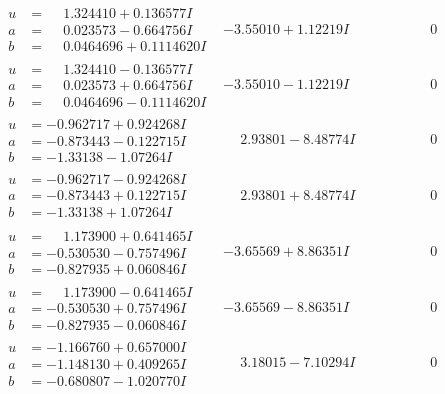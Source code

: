 \documentclass[1p]{elsarticle_modified}
\theoremstyle{definition}
\begin{document}
$$\begin{array}{c|c|c}
\begin{aligned}
u &= \phantom{-}1.324410 + 0.136577 I \\
a &= \phantom{-}0.023573 - 0.664756 I \\
b &= \phantom{-}0.0464696 + 0.1114620 I\end{aligned}
 & -3.55010 + 1.12219 I & \phantom{-0.000000 } 0 \\ \hline\begin{aligned}
u &= \phantom{-}1.324410 - 0.136577 I \\
a &= \phantom{-}0.023573 + 0.664756 I \\
b &= \phantom{-}0.0464696 - 0.1114620 I\end{aligned}
 & -3.55010 - 1.12219 I & \phantom{-0.000000 } 0 \\ \hline\begin{aligned}
u &= -0.962717 + 0.924268 I \\
a &= -0.873443 - 0.122715 I \\
b &= -1.33138 - 1.07264 I\end{aligned}
 & \phantom{-}2.93801 - 8.48774 I & \phantom{-0.000000 } 0 \\ \hline\begin{aligned}
u &= -0.962717 - 0.924268 I \\
a &= -0.873443 + 0.122715 I \\
b &= -1.33138 + 1.07264 I\end{aligned}
 & \phantom{-}2.93801 + 8.48774 I & \phantom{-0.000000 } 0 \\ \hline\begin{aligned}
u &= \phantom{-}1.173900 + 0.641465 I \\
a &= -0.530530 - 0.757496 I \\
b &= -0.827935 + 0.060846 I\end{aligned}
 & -3.65569 + 8.86351 I & \phantom{-0.000000 } 0 \\ \hline\begin{aligned}
u &= \phantom{-}1.173900 - 0.641465 I \\
a &= -0.530530 + 0.757496 I \\
b &= -0.827935 - 0.060846 I\end{aligned}
 & -3.65569 - 8.86351 I & \phantom{-0.000000 } 0 \\ \hline\begin{aligned}
u &= -1.166760 + 0.657000 I \\
a &= -1.148130 + 0.409265 I \\
b &= -0.680807 - 1.020770 I\end{aligned}
 & \phantom{-}3.18015 - 7.10294 I & \phantom{-0.000000 } 0 \\ \hline\begin{aligned}

\end{aligned}
\end{array}$$
\end{document}
